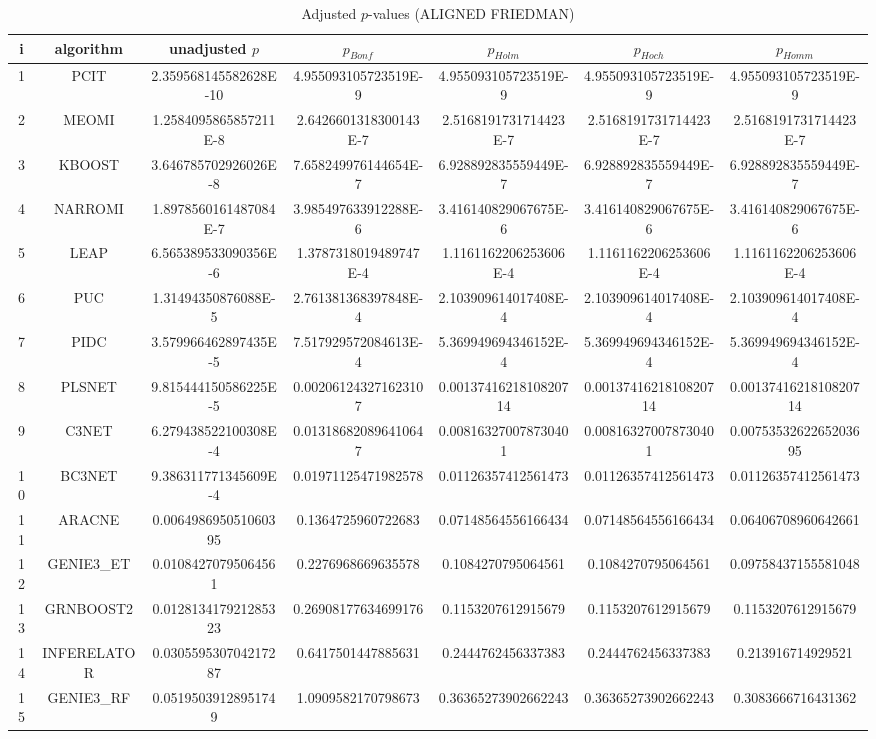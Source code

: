 \documentclass[a4paper,10pt]{article}
\begin{document}
\begin{landscape}
\begin{table}[!htp]
\centering\scriptsize
\caption{Adjusted $p$-values (ALIGNED FRIEDMAN)}
\begin{tabular}{ccccccc}
i&algorithm&unadjusted $p$&$p_{Bonf}$&$p_{Holm}$&$p_{Hoch}$&$p_{Homm}$\\
\hline
1&PCIT&2.359568145582628E-10&4.955093105723519E-9&4.955093105723519E-9&4.955093105723519E-9&4.955093105723519E-9\\
2&MEOMI&1.2584095865857211E-8&2.6426601318300143E-7&2.5168191731714423E-7&2.5168191731714423E-7&2.5168191731714423E-7\\
3&KBOOST&3.646785702926026E-8&7.658249976144654E-7&6.928892835559449E-7&6.928892835559449E-7&6.928892835559449E-7\\
4&NARROMI&1.8978560161487084E-7&3.985497633912288E-6&3.416140829067675E-6&3.416140829067675E-6&3.416140829067675E-6\\
5&LEAP&6.565389533090356E-6&1.3787318019489747E-4&1.1161162206253606E-4&1.1161162206253606E-4&1.1161162206253606E-4\\
6&PUC&1.31494350876088E-5&2.761381368397848E-4&2.103909614017408E-4&2.103909614017408E-4&2.103909614017408E-4\\
7&PIDC&3.579966462897435E-5&7.517929572084613E-4&5.369949694346152E-4&5.369949694346152E-4&5.369949694346152E-4\\
8&PLSNET&9.815444150586225E-5&0.002061243271623107&0.0013741621810820714&0.0013741621810820714&0.0013741621810820714\\
9&C3NET&6.279438522100308E-4&0.013186820896410647&0.008163270078730401&0.008163270078730401&0.0075353262265203695\\
10&BC3NET&9.386311771345609E-4&0.01971125471982578&0.01126357412561473&0.01126357412561473&0.01126357412561473\\
11&ARACNE&0.006498695051060395&0.1364725960722683&0.07148564556166434&0.07148564556166434&0.06406708960642661\\
12&GENIE3_ET&0.01084270795064561&0.2276968669635578&0.1084270795064561&0.1084270795064561&0.09758437155581048\\
13&GRNBOOST2&0.012813417921285323&0.26908177634699176&0.1153207612915679&0.1153207612915679&0.1153207612915679\\
14&INFERELATOR&0.030559530704217287&0.6417501447885631&0.2444762456337383&0.2444762456337383&0.213916714929521\\
15&GENIE3_RF&0.05195039128951749&1.0909582170798673&0.36365273902662243&0.36365273902662243&0.3083666716431362\\

\end{tabular}
\end{table}
\end{landscape}
\end{document}

